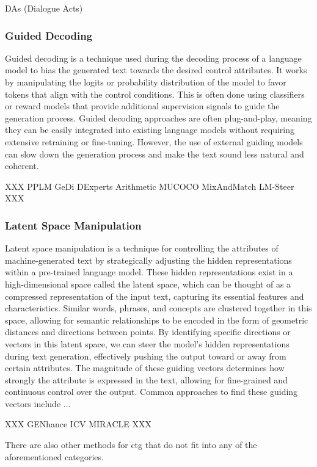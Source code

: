 DAs (Dialogue Acts)

\subsubsection{Guided Decoding}
Guided decoding is a technique used during the decoding process of a language model to bias the generated text towards the desired control attributes. 
It works by manipulating the logits or probability distribution of the model to favor tokens that align with the control conditions.
This is often done using classifiers or reward models that provide additional supervision signals to guide the generation process.
Guided decoding approaches are often plug-and-play, meaning they can be easily integrated into existing language models without requiring extensive retraining or fine-tuning.
However, the use of external guiding models can slow down the generation process and make the text sound less natural and coherent.

XXX
PPLM
GeDi
DExperts
Arithmetic
MUCOCO
MixAndMatch
LM-Steer
XXX

\subsubsection{Latent Space Manipulation}
Latent space manipulation is a technique for controlling the attributes of machine-generated text by strategically adjusting the hidden representations within a pre-trained language model. 
These hidden representations exist in a high-dimensional space called the latent space, which can be thought of as a compressed representation of the input text, capturing its essential features and characteristics.
Similar words, phrases, and concepts are clustered together in this space, allowing for semantic relationships to be encoded in the form of geometric distances and directions between points.
By identifying specific directions or vectors in this latent space, we can steer the model's hidden representations during text generation, effectively pushing the output toward or away from certain attributes.
The magnitude of these guiding vectors determines how strongly the attribute is expressed in the text, allowing for fine-grained and continuous control over the output.
Common approaches to find these guiding vectors include ...

XXX
GENhance
ICV
MIRACLE
XXX

There are also other methods for \gls{ctg} that do not fit into any of the aforementioned categories.


